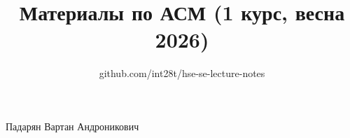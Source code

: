 \documentclass[a4paper,12pt]{article}
\title{Материалы по АСМ (1 курс, весна 2026)}
\author{github.com/int28t/hse-se-lecture-notes}
\date{}
\begin{document}
    \pagestyle{empty}
	\maketitle
    \begin{flushright}
		Падарян Вартан Андроникович
	\end{flushright}
	\tableofcontents{}
    \newpage
    \pagestyle{plain}
    
\end{document}
